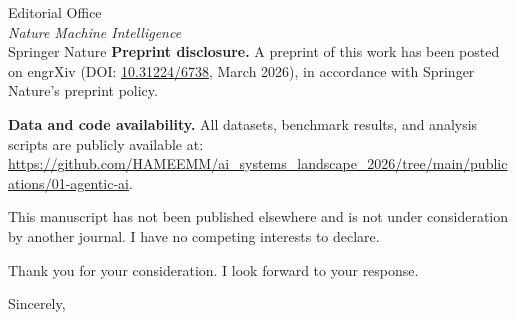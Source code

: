\documentclass[11pt]{letter}
\begin{document}
\begin{letter}{%
Editorial Office\\
\emph{Nature Machine Intelligence}\\
Springer Nature}
\textbf{Preprint disclosure.}
A preprint of this work has been posted on engrXiv (DOI: \href{https://doi.org/10.31224/6738}{10.31224/6738}, March 2026), in accordance with Springer Nature's preprint policy.

\textbf{Data and code availability.}
All datasets, benchmark results, and analysis scripts are publicly available at:\\ \url{https://github.com/HAMEEMM/ai_systems_landscape_2026/tree/main/publications/01-agentic-ai}.

This manuscript has not been published elsewhere and is not under consideration by another journal. I have no competing interests to declare.

Thank you for your consideration. I look forward to your response.

\closing{Sincerely,}

\end{letter}
\end{document}
